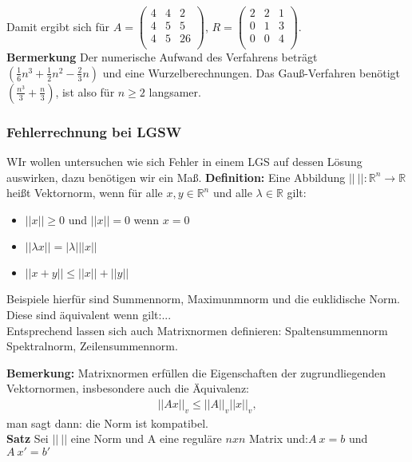\documentclass{scrartcl}
\begin{document}
Damit ergibt sich für $A=\begin{pmatrix}
4 & 4 & 2 \\
4 & 5 & 5 \\
4 & 5 & 26 \\
\end{pmatrix}$, $R=\begin{pmatrix}
2 & 2 & 1 \\
0 & 1 & 3 \\
0 & 0 & 4 \\
\end{pmatrix}$.\\
\textbf{Bermerkung} Der numerische Aufwand des Verfahrens beträgt $(\frac{1}{6} n^3 + \frac{1}{2} n^2 -\frac{2}{3} n)$ und eine Wurzelberechnungen.
Das Gauß-Verfahren benötigt$(\frac{n^3}{3}+\frac{n}{3})$, ist also für $n \geq 2 $ langsamer.

\subsubsection{Fehlerrechnung bei LGSW}
WIr wollen untersuchen wie sich Fehler in einem LGS auf dessen Lösung auswirken, dazu benötigen wir ein Maß.
\textbf{Definition:} Eine Abbildung $||\ ||: \mathbb{R}^n \rightarrow \mathbb{R}$ heißt Vektornorm, wenn für alle $x,y \in \mathbb{R}^n$ und alle $\lambda \in \mathbb{R}$ gilt:

\begin{itemize}
\item $||x|| \geq 0$ und $||x||=0$ wenn $x=0$
\item $|| \lambda x|| = |\lambda| ||x||$
\item $||x+y|| \leq ||x||+||y||$
\end{itemize}

Beispiele hierfür sind Summennorm, Maximunmnorm und die euklidische Norm.
Diese sind äquivalent wenn gilt:...\\

Entsprechend lassen sich auch Matrixnormen definieren: Spaltensummennorm Spektralnorm, Zeilensummennorm.

\textbf{Bemerkung:} Matrixnormen erfüllen die Eigenschaften der zugrundliegenden Vektornormen, insbesondere auch die Äquivalenz:
\begin{align*}
||A x||_v \leq ||A||_v||x||_v,
\end{align*}
man sagt dann: die Norm ist kompatibel.\\
\textbf{Satz} Sei $|| \ ||$ eine Norm und A eine reguläre $nxn$ Matrix und:$A \ x=b$ und $A \ x' =b'$
\end{document}
